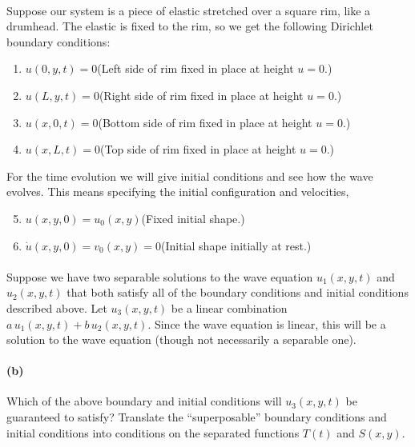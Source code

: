 \documentclass{article}
\begin{document}
\paragraph{}
Suppose our system is a piece of elastic stretched over a square rim, like a drumhead.  The elastic is fixed to the rim, so we get the following
Dirichlet boundary conditions:
	\begin{enumerate}
		\item $u(0,y,t) = 0$\quad (Left side of rim fixed in place at height $u=0$.)
		\item $u(L,y,t) = 0$\quad (Right side of rim fixed in place at height $u=0$.)
		\item $u(x,0,t) = 0$\quad (Bottom side of rim fixed in place at height $u=0$.)
		\item $u(x,L,t) = 0$\quad (Top side of rim fixed in place at height $u=0$.)
	\end{enumerate}	
For the time evolution we will give initial conditions and see how the wave evolves.  This means specifying the initial configuration and velocities,
	\begin{enumerate}
		\setcounter{enumi}{4}
		\item $u(x,y,0) = u_{0}(x,y)$\quad (Fixed initial shape.)
		\item $\dot{u}(x,y,0) = v_{0}(x,y) = 0$\quad (Initial shape initially at rest.)
	\end{enumerate}

\paragraph{}
Suppose we have two separable solutions to the wave equation $u_{1}(x,y,t)$ and $u_{2}(x,y,t)$ that both satisfy all of the boundary conditions and initial conditions described
above. Let $u_{3}(x,y,t)$ be a linear combination $a\,u_{1}(x,y,t)+b\,u_{2}(x,y,t)$.  
Since the wave equation is linear, this will be a solution to the wave equation (though not necessarily a
separable one).


\paragraph{(b)}
Which of the above boundary and initial conditions will $u_{3}(x,y,t)$ be guaranteed to satisfy?  Translate the ``superposable'' boundary conditions and initial conditions
into conditions on the separated functions $T(t)$ and $S(x,y)$.\\
\end{document}
